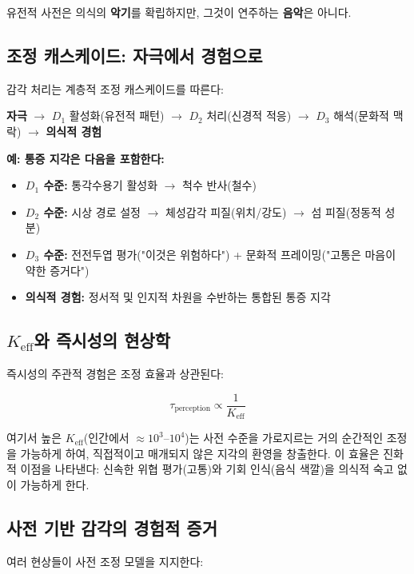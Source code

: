\documentclass[12pt,a4paper]{article}
\newcommand{\eff}{\mathrm{eff}}
\newcommand{\Ke}{K_{\eff}}
\begin{document}
	유전적 사전은 의식의 \textbf{악기}를 확립하지만, 그것이 연주하는 \textbf{음악}은 아니다.
	
	\subsection{조정 캐스케이드: 자극에서 경험으로}
	
	감각 처리는 계층적 조정 캐스케이드를 따른다:
	
	\begin{center}
		\textbf{자극} \(\rightarrow\) \(D_1\) 활성화(유전적 패턴) \(\rightarrow\) \(D_2\) 처리(신경적 적응) \(\rightarrow\) \(D_3\) 해석(문화적 맥락) \(\rightarrow\) \textbf{의식적 경험}
	\end{center}
	
	\textbf{예: 통증 지각은 다음을 포함한다:}
	\begin{itemize}
		\item \textbf{\(D_1\) 수준:} 통각수용기 활성화 \(\rightarrow\) 척수 반사(철수)
		\item \textbf{\(D_2\) 수준:} 시상 경로 설정 \(\rightarrow\) 체성감각 피질(위치/강도) \(\rightarrow\) 섬 피질(정동적 성분)
		\item \textbf{\(D_3\) 수준:} 전전두엽 평가("이것은 위험하다") + 문화적 프레이밍("고통은 마음이 약한 증거다")
		\item \textbf{의식적 경험:} 정서적 및 인지적 차원을 수반하는 통합된 통증 지각
	\end{itemize}
	
	\subsection{\(\Ke\)와 즉시성의 현상학}
	
	즉시성의 주관적 경험은 조정 효율과 상관된다:
	
	\[
	\tau_{\text{perception}} \propto \frac{1}{\Ke}
	\]
	
	여기서 높은 \(\Ke\)(인간에서 \(\approx 10^3\)--\(10^4\))는 사전 수준을 가로지르는 거의 순간적인 조정을 가능하게 하여, 직접적이고 매개되지 않은 지각의 환영을 창출한다. 이 효율은 진화적 이점을 나타낸다: 신속한 위협 평가(고통)와 기회 인식(음식 색깔)을 의식적 숙고 없이 가능하게 한다.
	
	\subsection{사전 기반 감각의 경험적 증거}
	
	여러 현상들이 사전 조정 모델을 지지한다:
	
\end{document}
